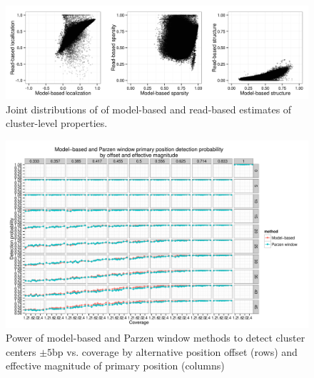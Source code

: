 
\begin{figure}[h]
\centering
\includegraphics[width=\textwidth]{figures/nucleosomes/figure_cluster_reproducibility_methods}
\caption{Joint distributions of of model-based and read-based estimates of cluster-level properties. \label{supp:nucleosomes:fig:methodComparison}}
\end{figure}


\begin{figure}
\centering
\includegraphics[page=1,width=0.95\textheight]{figures/nucleosomes/plots_compare_power}
\caption{Power of model-based and Parzen window methods to detect cluster centers $\pm 5$bp vs. coverage by alternative position offset (rows) and effective magnitude of primary position (columns)}
\end{figure}


